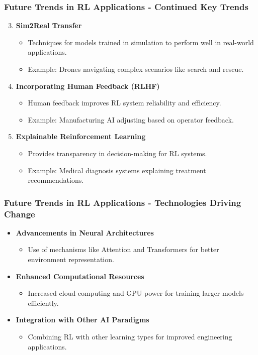 \documentclass[aspectratio=169]{beamer}
\begin{document}
\begin{frame}[fragile]
  \frametitle{Future Trends in RL Applications - Continued Key Trends}
  \begin{enumerate}
    \setcounter{enumi}{2}
    \item \textbf{Sim2Real Transfer}
      \begin{itemize}
        \item Techniques for models trained in simulation to perform well in real-world applications.
        \item Example: Drones navigating complex scenarios like search and rescue.
      \end{itemize}
    \item \textbf{Incorporating Human Feedback (RLHF)}
      \begin{itemize}
        \item Human feedback improves RL system reliability and efficiency.
        \item Example: Manufacturing AI adjusting based on operator feedback.
      \end{itemize}
    \item \textbf{Explainable Reinforcement Learning}
      \begin{itemize}
        \item Provides transparency in decision-making for RL systems.
        \item Example: Medical diagnosis systems explaining treatment recommendations.
      \end{itemize}
  \end{enumerate}
\end{frame}

\begin{frame}[fragile]
  \frametitle{Future Trends in RL Applications - Technologies Driving Change}
  \begin{itemize}
    \item \textbf{Advancements in Neural Architectures}
      \begin{itemize}
        \item Use of mechanisms like Attention and Transformers for better environment representation.
      \end{itemize}
    \item \textbf{Enhanced Computational Resources}
      \begin{itemize}
        \item Increased cloud computing and GPU power for training larger models efficiently.
      \end{itemize}
    \item \textbf{Integration with Other AI Paradigms}
      \begin{itemize}
        \item Combining RL with other learning types for improved engineering applications.
      \end{itemize}
  \end{itemize}
\end{frame}
\end{document}
